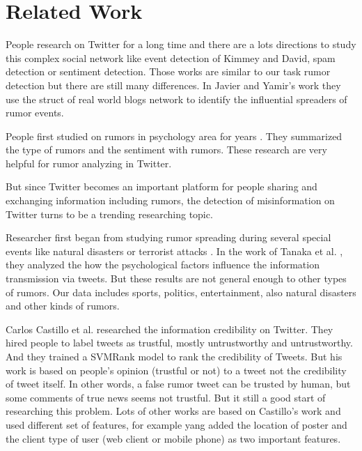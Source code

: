 \section{Related Work } %
People research on Twitter for a long time and there are a lots directions  to study this complex social network like event detection \cite{kimmey2015twitter} of Kimmey and David, spam detection \cite{ahmed2012mcl} \cite{wang2010don} or sentiment detection\cite{barbosa2010robust}. Those works are similar to our task rumor detection but there are  still many differences. In Javier and Yamir's work\cite{borge2012absence} they use the struct of real world blogs network to identify the influential spreaders of rumor events. 

People first studied on rumors in psychology area for years \cite{allport1947psychology} \cite{sunstein2014rumors}. They summarized the type of rumors and the sentiment with rumors. These research are very helpful for rumor analyzing in Twitter. 

But since Twitter becomes an important platform for people sharing and exchanging information including rumors, the detection of misinformation on Twitter turns to be a trending researching topic. 

Researcher first began from studying rumor spreading during several special events like natural disasters \cite{mendoza2010twitter}\cite{oh2010exploration}\cite{tanaka2012transmission}  or terrorist attacks \cite{starbird2014rumors}. In the work of Tanaka et al. \cite{tanaka2012transmission}, they analyzed the how the psychological factors influence the information transmission via tweets.  But these results are not general enough to other types of rumors. Our data includes sports, politics, entertainment, also natural disasters and other kinds of rumors. 

Carlos Castillo et al. researched the information credibility on Twitter\cite{castillo2011information}\cite{gupta2014tweetcred}. They hired people to label tweets as trustful, mostly untrustworthy and untrustworthy. And they trained a SVMRank model to rank the credibility of Tweets. But his work is based on people's opinion (trustful or not) to a tweet not the credibility of tweet itself. In other words, a false rumor tweet can be trusted by human, but some comments of true news seems not trustful. But it still a good start of researching this problem. Lots of other works are based on Castillo's work \cite{yang2012automatic}\cite{liu2015real}  and used different set of features, for example yang \cite{yang2012automatic} added the location of poster and the client type of user (web client or mobile phone) as two important features.

